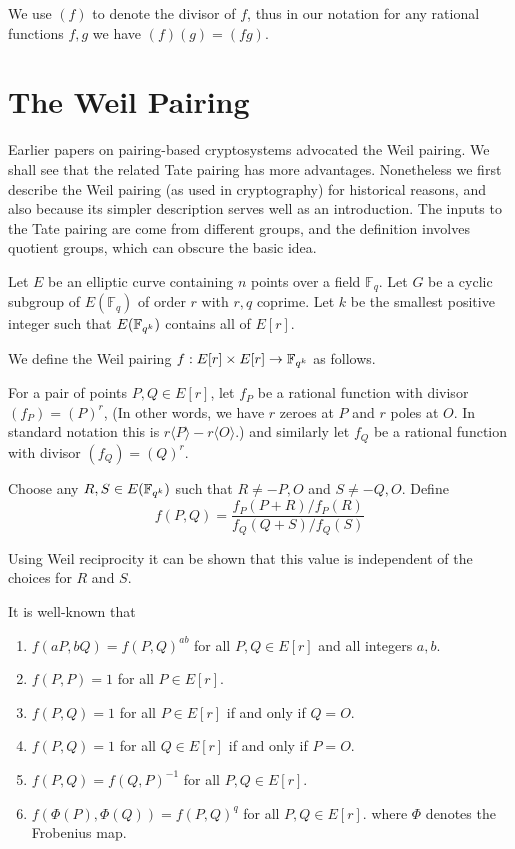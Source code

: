 We use
$(f)$ to denote the divisor of $f$, thus in our notation
for any rational functions $f, g$ we have $(f)(g) = (f g)$.

\section {The Weil Pairing}

Earlier papers on pairing-based cryptosystems advocated the Weil pairing.
We shall see that the related Tate pairing has more advantages.
Nonetheless we first describe the Weil pairing (as used in cryptography)
for historical reasons, and also because its simpler description
serves well as an introduction. The inputs to the Tate pairing are come
from different groups, and the definition involves quotient groups,
which can obscure the basic idea.

Let $E$ be an elliptic curve containing $n$ points over a field $\mathbb{F}_q$.
Let $G$ be a cyclic subgroup of $E(\mathbb{F}_q)$ of order $r$ with $r, q$
coprime. Let $k$ be the smallest positive integer such that $E(\mathbb{F}_{q^k})$
contains all of $E[r]$.

We define the Weil pairing
$f:E[r] \times E[r] \rightarrow \mathbb{F}_{q^k}$ as follows.

For a pair of points $P, Q \in E[r]$,
let $f_P$ be a rational function with divisor $(f_P) = (P)^r$,
(In other words, we have $r$ zeroes at $P$ and $r$ poles at $O$.
In standard notation this is $r\langle P\rangle  - r\langle O\rangle$.)
and similarly let $f_Q$ be a rational function with divisor $(f_Q) = (Q)^r$.

Choose any $R, S \in E(\mathbb{F}_{q^k})$ such that $R \ne -P, O$ and $S \ne -Q, O$.
Define
\[ f(P,Q) = \frac{f_P(P+R)/f_P(R)}{f_Q(Q+S)/f_Q(S)} \]

Using Weil reciprocity it can be shown that this value is independent
of the choices for $R$ and $S$.

It is well-known that
\begin{enumerate}
\item
$f(a P, b Q) = f(P,Q)^{a b}$ for all $P, Q \in E[r]$ and all integers $a, b$.
\item
$f(P,P) = 1$ for all $P \in E[r]$.
\item
$f(P,Q) = 1$ for all $P \in E[r]$ if and only if $Q = O$.
\item
$f(P,Q) = 1$ for all $Q \in E[r]$ if and only if $P = O$.
\item
$f(P,Q) = f(Q,P)^{-1}$ for all $P,Q \in E[r]$.
\item
$f(\Phi(P),\Phi(Q)) = f(P,Q)^{q}$ for all $P,Q \in E[r]$.
where $\Phi$ denotes the Frobenius map.
\end{enumerate}

